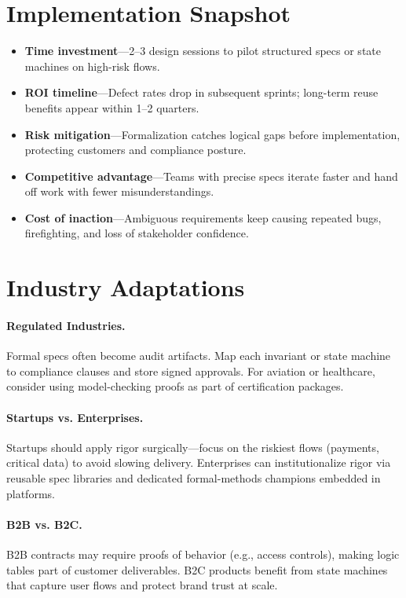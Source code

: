 \section{Implementation Snapshot}
\label{sec:math-snapshot}
\begin{itemize}
    \item \textbf{Time investment}—2--3 design sessions to pilot structured specs or state machines on high-risk flows.
    \item \textbf{ROI timeline}—Defect rates drop in subsequent sprints; long-term reuse benefits appear within 1--2 quarters.
    \item \textbf{Risk mitigation}—Formalization catches logical gaps before implementation, protecting customers and compliance posture.
    \item \textbf{Competitive advantage}—Teams with precise specs iterate faster and hand off work with fewer misunderstandings.
    \item \textbf{Cost of inaction}—Ambiguous requirements keep causing repeated bugs, firefighting, and loss of stakeholder confidence.
\end{itemize}
\section{Industry Adaptations}
\label{sec:math-adaptations}
\paragraph{Regulated Industries.} Formal specs often become audit artifacts. Map each invariant or state machine to compliance clauses and store signed approvals. For aviation or healthcare, consider using model-checking proofs as part of certification packages.

\paragraph{Startups vs. Enterprises.} Startups should apply rigor surgically—focus on the riskiest flows (payments, critical data) to avoid slowing delivery. Enterprises can institutionalize rigor via reusable spec libraries and dedicated formal-methods champions embedded in platforms.

\paragraph{B2B vs. B2C.} B2B contracts may require proofs of behavior (e.g., access controls), making logic tables part of customer deliverables. B2C products benefit from state machines that capture user flows and protect brand trust at scale.

